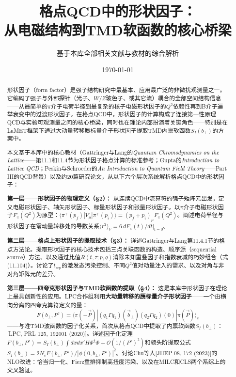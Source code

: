 \documentclass[12pt,a4paper]{ctexart}
\title{\heiti 格点QCD中的形状因子：\\
从电磁结构到TMD软函数的核心桥梁}
\author{基于本库全部相关文献与教材的综合解析}
\date{\today}
\theoremstyle{definition}
\begin{document}
\maketitle

\begin{abstract}
\noindent
形状因子（form factor）是强子结构研究中最基本、应用最广泛的非微扰观测量之一。它编码了强子与外部探针（光子、$W/Z$玻色子、或其它流）耦合的全部空间结构信息——从最简单的$\pi$介子电荷半径到最复杂的核子电磁形状因子的$Q^2$依赖性再到B介子遍举衰变中的过渡形状因子。在格点QCD中，形状因子的计算构成了连接第一性原理QCD与实验可观测量之间的核心桥梁，同时也在理论内部扮演着关键角色——特别是在LaMET框架下通过大动量转移赝标量介子形状因子提取TMD内禀软函数$S_I(b_\perp)$的方案中。

本文基于本库中的核心教材（Gattringer与Lang的\textit{Quantum Chromodynamics on the Lattice}——第11.1和11.4节为形状因子格点计算的标准参考；Gupta的\textit{Introduction to Lattice QCD}；Peskin与Schroeder的\textit{An Introduction to Quantum Field Theory}——Part III的QCD背景）以及约20篇研究论文，从以下六个层次系统解析格点QCD中的形状因子：

\textbf{第一层——形状因子的物理定义（§2）：}
从连续QCD中流算符的强子矩阵元出发，定义电磁形状因子、轴矢形状因子、标量形状因子和张量形状因子。以$\pi$介子电磁形状因子$F_\pi(Q^2)$为原型：$\langle \pi^+(p_f) | V_\mu | \pi^+(p_i) \rangle = (p_f + p_i)_\mu F_\pi(Q^2)$。阐述电荷半径与形状因子在零动量转移处的导数关系$\langle r^2\rangle_V = 6\,dF_\pi(t)/dt|_{t=0}$。

\textbf{第二层——格点上形状因子的提取技术（§3）：}
详述Gattringer与Lang第11.4.1节的格点方法论。提取形状因子的核心技术包括三点关联函数的构造、顺序源（sequential source）方法、以及通过比值$R(t,\tau;p,q)$消除未知重叠因子和指数衰减的巧妙组合（式(11.104)）。讨论了$t_{\text{sep}}$的激发态污染控制、不同$Q^2$值对动量注入的需求、以及对角与非对角矩阵元的差异。

\textbf{第三层——四夸克形状因子与TMD软函数的提取（§4）：}
这是本库中形状因子在理论上最具创新性的应用。LPC合作组利用\textbf{大动量转移的赝标量介子形状因子}——一个由横向分离的四夸克算符定义的量：
\begin{equation*}
F(b_\perp, P^z) = \langle \pi(-\vec P) | (q_1\Gamma q_1)(\vec b_\perp)(q_2\Gamma q_2)(0) | \pi(\vec P) \rangle_c
\end{equation*}
——与准TMD波函数的因子化关系，首次从格点QCD中提取了内禀软函数$S_I(b_\perp)$：[LPC, PRL 125, 192001 (2020)]。详述因子化定理$F(b_\perp, P^z) = S_I(b_\perp) \int dx dx' H \Phi^\dagger \Phi + \mathcal{O}(1/(P^z)^2)$和领头阶提取公式$S_I(b_\perp) = 2N_c F(b_\perp, P^z)/|\phi(0,b_\perp,P^z)|^2$。讨论Chu等人[JHEP 08, 172 (2023)]的NLO改进：恰当归一化、Fierz重排抑制高扭度污染、以及在MILC和CLS两个系综上的交叉验证。


\end{abstract}
\end{document}
